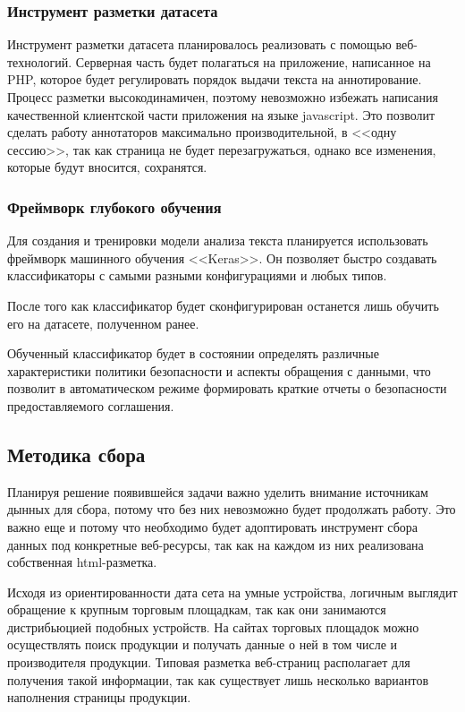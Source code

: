 \documentclass[../main]{subfiles}
\begin{document}
\subsubsection{Инструмент разметки датасета}
Инструмент разметки датасета планировалось реализовать с помощью веб-технологий. Серверная часть будет полагаться на приложение, написанное на PHP, которое будет регулировать порядок выдачи текста на аннотирование. Процесс разметки высокодинамичен, поэтому невозможно избежать написания качественной клиентской части приложения на языке javascript. Это позволит сделать работу аннотаторов максимально производительной, в <<одну сессию>>, так как страница не будет перезагружаться, однако все изменения, которые будут вносится, сохранятся.

\subsubsection{Фреймворк глубокого обучения}
Для создания и тренировки модели анализа текста планируется использовать фреймворк машинного обучения <<Keras>>. Он позволяет быстро создавать классификаторы с самыми разными конфигурациями и любых типов.

После того как классификатор будет сконфигурирован останется лишь обучить его на датасете, полученном ранее.

Обученный классификатор будет в состоянии определять различные характеристики политики безопасности и аспекты обращения с данными, что позволит в автоматическом режиме формировать краткие отчеты о безопасности предоставляемого соглашения.

\subsection{Методика сбора}
Планируя решение появившейся задачи важно уделить внимание источникам дынных для сбора, потому что без них невозможно будет продолжать работу. Это важно еще и потому что необходимо будет адоптировать инструмент сбора данных под конкретные веб-ресурсы, так как на каждом из них реализована собственная html-разметка.

Исходя из ориентированности дата сета на умные устройства, логичным выглядит обращение к крупным торговым площадкам, так как они занимаются дистрибьюцией подобных устройств. На сайтах торговых площадок можно осуществлять поиск продукции и получать данные о ней в том числе и производителя продукции. Типовая разметка веб-страниц располагает для получения такой информации, так как существует лишь несколько вариантов наполнения страницы продукции.
\end{document}
